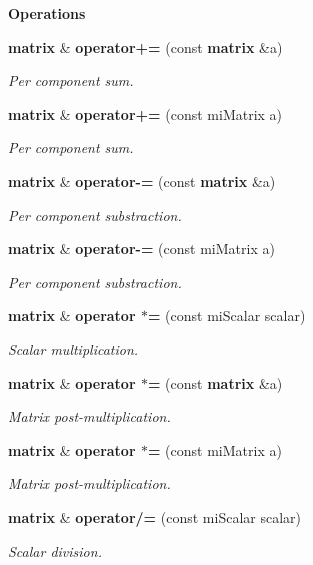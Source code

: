 \begin{Indent}{\bf Operations}
\begin{CompactItemize}
{\bf matrix} \& {\bf operator+=} (const {\bf matrix} \&a)
\begin{CompactList}\small\item\em Per component sum. \item\end{CompactList}\item 
{\bf matrix} \& {\bf operator+=} (const mi\-Matrix a)
\begin{CompactList}\small\item\em Per component sum. \item\end{CompactList}\item 
{\bf matrix} \& {\bf operator-=} (const {\bf matrix} \&a)
\begin{CompactList}\small\item\em Per component substraction. \item\end{CompactList}\item 
{\bf matrix} \& {\bf operator-=} (const mi\-Matrix a)
\begin{CompactList}\small\item\em Per component substraction. \item\end{CompactList}\item 
{\bf matrix} \& {\bf operator $\ast$=} (const mi\-Scalar scalar)
\begin{CompactList}\small\item\em Scalar multiplication. \item\end{CompactList}\item 
{\bf matrix} \& {\bf operator $\ast$=} (const {\bf matrix} \&a)
\begin{CompactList}\small\item\em Matrix post-multiplication. \item\end{CompactList}\item 
{\bf matrix} \& {\bf operator $\ast$=} (const mi\-Matrix a)
\begin{CompactList}\small\item\em Matrix post-multiplication. \item\end{CompactList}\item 
{\bf matrix} \& {\bf operator/=} (const mi\-Scalar scalar)
\begin{CompactList}\small\item\em Scalar division. \item\end{CompactList}\item 

\end{CompactItemize}
\end{Indent}
